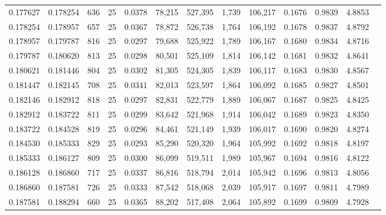 \begin{tabular}{rrrrrrrrrrrrr}
0.177627 & 0.178254 &   636 &  25 &                                     0.0378 &  78,215 & 527,395 &   1,739 & 106,217 & 0.1676 & 0.9839 & 4.8853 \\
0.178254 & 0.178957 &   657 &  25 &                                     0.0367 &  78,872 & 526,738 &   1,764 & 106,192 & 0.1678 & 0.9837 & 4.8792 \\
0.178957 & 0.179787 &   816 &  25 &                                     0.0297 &  79,688 & 525,922 &   1,789 & 106,167 & 0.1680 & 0.9834 & 4.8716 \\
0.179787 & 0.180620 &   813 &  25 &                                     0.0298 &  80,501 & 525,109 &   1,814 & 106,142 & 0.1681 & 0.9832 & 4.8641 \\
0.180621 & 0.181446 &   804 &  25 &                                     0.0302 &  81,305 & 524,305 &   1,839 & 106,117 & 0.1683 & 0.9830 & 4.8567 \\
0.181447 & 0.182145 &   708 &  25 &                                     0.0341 &  82,013 & 523,597 &   1,864 & 106,092 & 0.1685 & 0.9827 & 4.8501 \\
0.182146 & 0.182912 &   818 &  25 &                                     0.0297 &  82,831 & 522,779 &   1,889 & 106,067 & 0.1687 & 0.9825 & 4.8425 \\
0.182912 & 0.183722 &   811 &  25 &                                     0.0299 &  83,642 & 521,968 &   1,914 & 106,042 & 0.1689 & 0.9823 & 4.8350 \\
0.183722 & 0.184528 &   819 &  25 &                                     0.0296 &  84,461 & 521,149 &   1,939 & 106,017 & 0.1690 & 0.9820 & 4.8274 \\
0.184530 & 0.185333 &   829 &  25 &                                     0.0293 &  85,290 & 520,320 &   1,964 & 105,992 & 0.1692 & 0.9818 & 4.8197 \\
0.185333 & 0.186127 &   809 &  25 &                                     0.0300 &  86,099 & 519,511 &   1,989 & 105,967 & 0.1694 & 0.9816 & 4.8122 \\
0.186128 & 0.186860 &   717 &  25 &                                     0.0337 &  86,816 & 518,794 &   2,014 & 105,942 & 0.1696 & 0.9813 & 4.8056 \\
0.186860 & 0.187581 &   726 &  25 &                                     0.0333 &  87,542 & 518,068 &   2,039 & 105,917 & 0.1697 & 0.9811 & 4.7989 \\
0.187581 & 0.188294 &   660 &  25 &                                     0.0365 &  88,202 & 517,408 &   2,064 & 105,892 & 0.1699 & 0.9809 & 4.7928 \\

\end{tabular}
